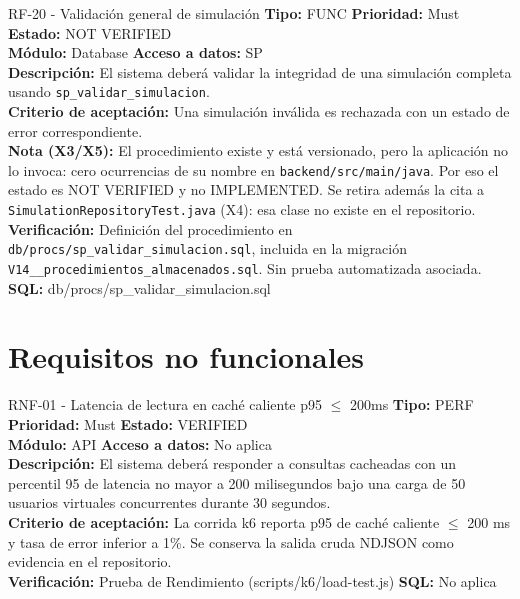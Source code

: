 \documentclass[11pt,a4paper]{article}
\begin{document}
\begin{requisito}{RF-20 - Validación general de simulación}
    \textbf{Tipo:} FUNC \quad \textbf{Prioridad:} Must \quad \textbf{Estado:} NOT VERIFIED \\[0.2cm]
    \textbf{Módulo:} Database \quad \textbf{Acceso a datos:} SP \\[0.2cm]
    \textbf{Descripción:} El sistema deberá validar la integridad de una simulación completa usando \texttt{sp\_validar\_simulacion}. \\[0.2cm]
    \textbf{Criterio de aceptación:} Una simulación inválida es rechazada con un estado de error correspondiente. \\[0.2cm]
    \textbf{Nota (X3/X5):} El procedimiento existe y está versionado, pero la aplicación no lo invoca: cero ocurrencias de su nombre en \texttt{backend/src/main/java}. Por eso el estado es NOT VERIFIED y no IMPLEMENTED. Se retira además la cita a \texttt{SimulationRepositoryTest.java} (X4): esa clase no existe en el repositorio. \\[0.2cm]
    \textbf{Verificación:} Definición del procedimiento en \texttt{db/procs/sp\_validar\_simulacion.sql}, incluida en la migración \texttt{V14\_\_procedimientos\_almacenados.sql}. Sin prueba automatizada asociada. \quad \textbf{SQL:} db/procs/sp\_validar\_simulacion.sql
\end{requisito}

\newpage
\section{Requisitos no funcionales}

\begin{requisito}{RNF-01 - Latencia de lectura en caché caliente p95 $\le$ 200ms}
    \textbf{Tipo:} PERF \quad \textbf{Prioridad:} Must \quad \textbf{Estado:} VERIFIED \\[0.2cm]
    \textbf{Módulo:} API \quad \textbf{Acceso a datos:} No aplica \\[0.2cm]
    \textbf{Descripción:} El sistema deberá responder a consultas cacheadas con un percentil 95 de latencia no mayor a 200 milisegundos bajo una carga de 50 usuarios virtuales concurrentes durante 30 segundos. \\[0.2cm]
    \textbf{Criterio de aceptación:} La corrida k6 reporta p95 de caché caliente $\leq$ 200 ms y tasa de error inferior a 1\%. Se conserva la salida cruda NDJSON como evidencia en el repositorio. \\[0.2cm]
    \textbf{Verificación:} Prueba de Rendimiento (scripts/k6/load-test.js) \quad \textbf{SQL:} No aplica
\end{requisito}
\end{document}
